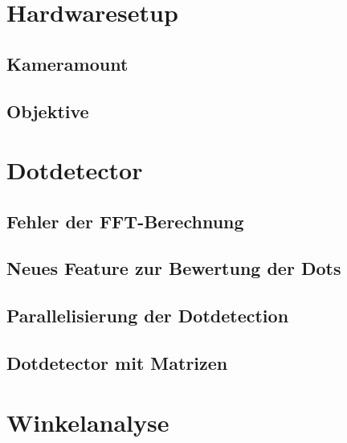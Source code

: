\documentclass[11pt,a4paper]{article}
\title{\Veranstaltung}
\author{\Autoren}
\date{\today}
\begin{document}
\maketitle


%
%
%
%

\section{Hardwaresetup}%

\subsection{Kameramount}%
\subsection{Objektive}%


\section{Dotdetector}%

\subsection{Fehler der FFT-Berechnung}%
\subsection{Neues Feature zur Bewertung der Dots}%
\subsection{Parallelisierung der Dotdetection}%
\subsection{Dotdetector mit Matrizen}%

\section{Winkelanalyse}%
\end{document}
